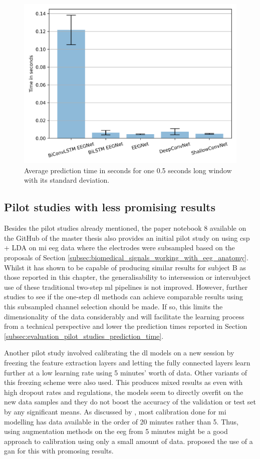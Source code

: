 \begin{figure}[ht]
    \centering
    \includegraphics[width=0.6\linewidth]{../images/results/prediction_time.pdf}
    \captionsetup{width=0.6\linewidth}
    \captionsetup{justification=centering}
    \caption{Average prediction time in seconds for one 0.5 seconds long window with its standard deviation.} 
    \label{fig:results_predict_time}
\end{figure}


\subsection{Pilot studies with less promising results}
\label{subsec:evaluation_pilot_studies_others}

Besides the pilot studies already mentioned, the paper notebook 8 available on the GitHub of the master thesis also provides an initial pilot study on using \gls{csp} + LDA on \gls{mi} \gls{eeg} data where the electrodes were subsampled based on the proposals of Section \ref{subsec:biomedical_signals_working_with_eeg_anatomy}.
Whilst it has shown to be capable of producing similar results for subject B as those reported in this chapter, the generalisability to intersession or intersubject use of these traditional two-step \gls{ml} pipelines is not improved.
However, further studies to see if the one-step \gls{dl} methods can achieve comparable results using this subsampled channel selection should be made.
If so, this limits the dimensionality of the data considerably and will facilitate the learning process from a technical perspective and lower the prediction times reported in Section \ref{subsec:evaluation_pilot_studies_prediction_time}.

Another pilot study involved calibrating the \gls{dl} models on a new session by freezing the feature extraction layers and letting the fully connected layers learn further at a low learning rate using 5 minutes' worth of data.
Other variants of this freezing scheme were also used.
This produces mixed results as even with high dropout rates and regulations, the models seem to directly overfit on the new data samples and they do not boost the accuracy of the validation or test set by any significant means.
As discussed by \citet{eeg_model_eegnet}, most calibration done for \gls{mi} modelling has data available in the order of 20 minutes rather than 5.
Thus, using augmentation methods on the \gls{eeg} from 5 minutes might be a good approach to calibration using only a small amount of data.
 proposed the use of a \gls{gan} for this with promosing results.


